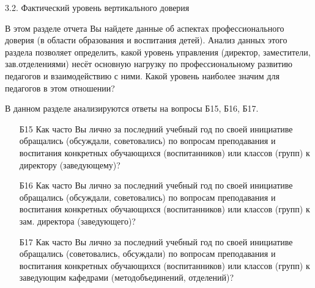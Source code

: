 \begin{frame}{3.2. Фактический уровень вертикального доверия}

\tiny

В этом разделе отчета  Вы найдете данные об аспектах профессионального доверия 
(в области образования и воспитания детей). Анализ данных этого раздела позволяет определить, 
какой уровень управления (директор, заместители, зав.отделениями) несёт основную нагрузку по 
профессиональному развитию педагогов и взаимодействию  с ними. 
Какой уровень наиболее значим для педагогов в этом отношении?
\bigskip

В данном разделе анализируются ответы на вопросы Б15, Б16, Б17.
\bigskip

\begin{itemize}

\item [Б15] Как часто Вы лично за последний учебный год по своей инициативе обращались (обсуждали, советовались) по вопросам преподавания и воспитания конкретных обучающихся (воспитанников) или классов (групп) к директору (заведующему)?

\item [Б16] Как часто Вы лично за последний учебный год по своей инициативе обращались (обсуждали, советовались) по вопросам преподавания и воспитания конкретных обучающихся (воспитанников) или классов (групп) к зам. директора (заведующего)?

\item [Б17] Как часто Вы лично за последний учебный год по своей инициативе обращались (советовались, обсуждали) по вопросам преподавания и воспитания конкретных обучающихся (воспитанников) или классов (групп)  к заведующим кафедрами  (методобъединений, отделений)?

\end{itemize}

\end{frame}



